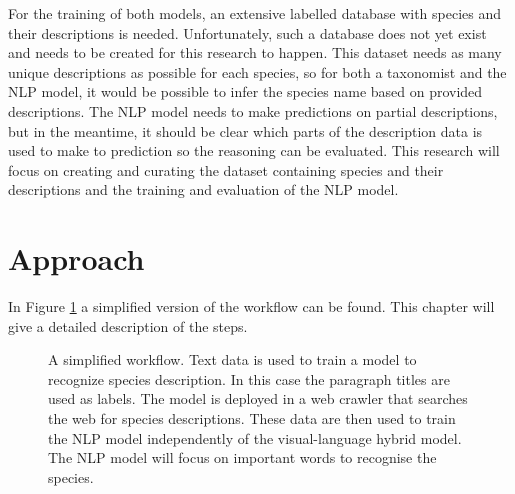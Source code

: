 \documentclass[a4paper, 12pt, oneside]{book} %
\begin{document}
For the training of both models, an extensive labelled database with species and their descriptions is needed. 
Unfortunately, such a database does not yet exist and needs to be created for this research to happen.
This dataset needs as many unique descriptions as possible for each species, so for both a taxonomist and the NLP model, it would be possible to infer the species name based on provided descriptions.
The NLP model needs to make predictions on partial descriptions, but in the meantime, it should be clear which parts of the description data is used to make to prediction so the reasoning can be evaluated.
This research will focus on creating and curating the dataset containing species and their descriptions and the training and evaluation of the NLP model.
\newpage
\section{Approach}

In Figure \ref{fig:workflow} a simplified version of the workflow can be found.
This chapter will give a detailed description of the steps.

\begin{figure} [t]
    \centering
    \vspace{-2cm}
    \caption{A simplified workflow. Text data is used to train a model to recognize species description. In this case the paragraph titles are used as labels. The model is deployed in a web crawler that searches the web for species descriptions. These data are then used to train the NLP model independently of the visual-language hybrid model. The NLP model will focus on important words to recognise the species.}
    \label{fig:workflow}
\end{figure}
\end{document}
